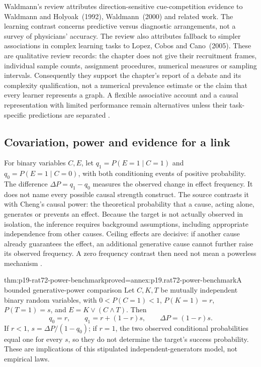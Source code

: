 Waldmann's review attributes direction-sensitive cue-competition
evidence to Waldmann and Holyoak~(1992), Waldmann~(2000) and related
work. The learning contrast concerns predictive versus diagnostic
arrangements, not a survey of physicians' accuracy. The review also
attributes fallback to simpler associations in complex learning tasks
to Lopez, Cobos and Cano~(2005). These are qualitative review records:
the chapter does not give their recruitment frames, individual sample
counts, assignment procedures, numerical measures or sampling intervals.
Consequently they support the chapter's report of a debate and its
complexity qualification, not a numerical prevalence estimate or the
claim that every learner represents a graph. A flexible associative
account and a causal representation with limited performance remain
alternatives unless their task-specific predictions are separated
\cite[Sec.~3.1, p.~441]{Waldmann2021EverydayCausal}.

\subsection{Covariation, power and evidence for a link}

For binary variables \(C,E\), let \(q_1=P(E=1\mid C=1)\) and
\(q_0=P(E=1\mid C=0)\), with both conditioning events of positive
probability. The difference \(\Delta P=q_1-q_0\) measures the observed
change in effect frequency. It does not name every possible causal
strength construct. The source contrasts it with Cheng's causal power:
the theoretical probability that a cause, acting alone, generates or
prevents an effect. Because the target is not actually observed in
isolation, the inference requires background assumptions, including
appropriate independence from other causes. Ceiling effects are decisive:
if another cause already guarantees the effect, an additional generative
cause cannot further raise its observed frequency. A zero frequency
contrast then need not mean a powerless mechanism
\cite[pp.~441--442]{Waldmann2021EverydayCausal}.

\begin{hbtheorem}{thm:p19-rat72-power-benchmark}{proved=annex:p19.rat72-power-benchmark}{A bounded generative-power comparison}
Let \(C,K,T\) be mutually independent binary random variables, with
\(0<P(C=1)<1\), \(P(K=1)=r\), \(P(T=1)=s\), and
\(E=K\lor(C\land T)\). Then
\[
 q_0=r,\qquad q_1=r+(1-r)s,\qquad \Delta P=(1-r)s.
\]
If \(r<1\), \(s=\Delta P/(1-q_0)\); if \(r=1\), the two observed
conditional probabilities equal one for every \(s\), so they do not
determine the target's success probability. These are implications of
this stipulated independent-generators model, not empirical laws.
\end{hbtheorem}

